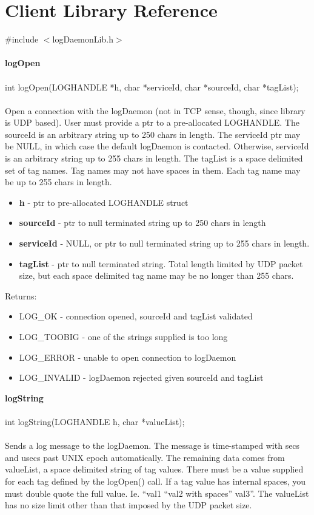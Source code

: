 \documentclass[11pt]{article}
\begin{document}
\section{Client Library Reference}

\#include $<$logDaemonLib.h$>$\\
\\
{\bf logOpen}\\
\\
int logOpen(LOGHANDLE *h, char *serviceId, char *sourceId, char *tagList);\\
\\
Open a connection with the logDaemon (not in TCP sense, though, since library is UDP based). User must provide a ptr to a pre-allocated LOGHANDLE. The sourceId is an arbitrary string up to 250 chars in length. The serviceId ptr may be NULL, in which case the default logDaemon is contacted. Otherwise, serviceId is an arbitrary string up to 255 chars in length. The tagList is a space delimited set of tag names. Tag names may not have spaces in them. Each tag name may be up to 255 chars in length.

\begin{itemize}
\item {\bf h} - ptr to pre-allocated LOGHANDLE struct
\item {\bf sourceId} - ptr to null terminated string up to 250 chars in length
\item {\bf serviceId} - NULL, or ptr to null terminated string up to 255 chars in length.
\item {\bf tagList} - ptr to null terminated string. Total length limited by UDP packet size, but each space delimited tag name may be no longer than 255 chars.
\end{itemize}
Returns:

\begin{itemize}
\item LOG\_OK - connection opened, sourceId and tagList validated
\item LOG\_TOOBIG - one of the strings supplied is too long
\item LOG\_ERROR - unable to open connection to logDaemon
\item LOG\_INVALID - logDaemon rejected given sourceId and tagList
\end{itemize}
{\bf logString}\\
\\
int logString(LOGHANDLE h, char *valueList);\\
\\
Sends a log message to the logDaemon. The message is time-stamped with secs and usecs past UNIX epoch automatically. The remaining data comes from valueList, a space delimited string of tag values. There must be a value supplied for each tag defined by the logOpen() call. If a tag value has internal spaces, you must double quote the full value. Ie. ``val1 ``val2 with spaces'' val3''. The valueList has no size limit other than that imposed by the UDP packet size.
\end{document}
